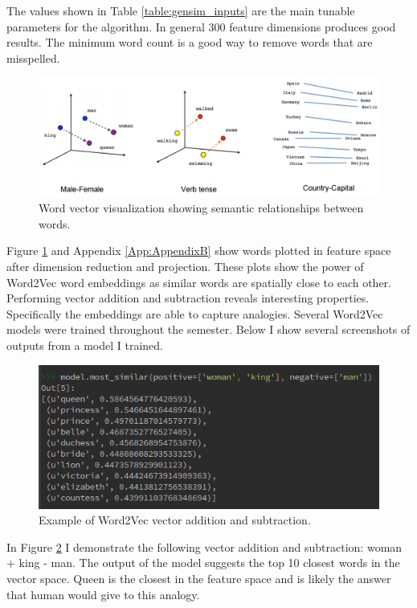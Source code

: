 \documentclass[12pt]{article}
\begin{document}
The values shown in Table \ref{table:gensim_inputs} are the main tunable parameters for the algorithm. In general 300 feature dimensions produces good results. The minimum word count is a good way to remove words that are misspelled. 

\begin{figure}[htbp!]
	\centering
	\includegraphics[scale=.3]{linear-relationships.png}
	\caption{Word vector visualization \cite{tensorflow} showing semantic relationships between words.}
	\label{fig:linear-relation}
\end{figure}

Figure \ref{fig:linear-relation} and Appendix \ref{App:AppendixB} show words plotted in feature space after dimension reduction and projection. These plots show the power of Word2Vec word embeddings as similar words are spatially close to each other. Performing vector addition and subtraction reveals interesting properties. Specifically the embeddings are able to capture analogies. Several Word2Vec models were trained throughout the semester. Below I show several screenshots of outputs from a model I trained.

\begin{figure}[htbp!]
	\centering
	\includegraphics[scale=.5]{man_woman.png}
	\caption{Example of Word2Vec vector addition and subtraction.}
	\label{fig:man_woman}
\end{figure}

In Figure \ref{fig:man_woman} I demonstrate the following vector addition and subtraction: woman + king - man. The output of the model suggests the top 10 closest words in the vector space. Queen is the closest in the feature space and is likely the answer that human would give to this analogy.
\end{document}
